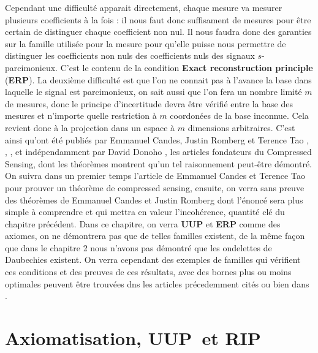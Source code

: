 Cependant une difficulté apparait directement, chaque mesure va mesurer plusieurs coefficients à la fois : il  nous faut donc suffisament de mesures pour être certain de distinguer chaque coefficient non nul.
Il nous faudra donc des garanties sur la famille utilisée pour la mesure pour qu'elle puisse nous permettre de distinguer les coefficients non nuls des coefficients nuls des signaux $s$-parcimonieux.
C'est le contenu de la condition \textbf{Exact reconstruction principle} (\textbf{ERP}).
\newline
La deuxième difficulté est que l'on ne connait pas à l'avance la base dans laquelle le signal est parcimonieux, on sait aussi que l'on fera un nombre limité $m$ de mesures, donc le principe d'incertitude devra être vérifié entre la base des mesures et n'importe quelle restriction à $m$ coordonées de la base inconnue.
Cela revient donc à la projection dans un espace à $m$ dimensions arbitraires.
C'est ainsi qu'ont été publiés par Emmanuel Candes, Justin Romberg et Terence Tao \cite{CR}, \cite{CT}, \cite{CRT}, et indépendamment par David Donoho \cite{DonohoCS}, les articles fondateurs du Compressed Sensing, dont les théorèmes montrent qu'un tel raisonnement peut-être démontré. 
\newline
On suivra dans un premier temps l'article de Emmanuel Candes et Terence Tao pour prouver un théorème de compressed sensing, ensuite, on verra sans preuve des théorèmes de Emmanuel Candes et Justin Romberg dont l'énoncé sera plus simple à comprendre et qui mettra en valeur l'incohérence, quantité clé du chapitre précédent.
Dans ce chapitre, on verra \textbf{UUP} et \textbf{ERP} comme des axiomes, on ne démontrera pas que de telles familles existent, de la même façon que dans le chapitre 2 nous n'avons pas démontré que les ondelettes de Daubechies existent.
On verra cependant des exemples de familles qui vérifient ces conditions et des preuves de ces résultats, avec des bornes plus ou moins optimales peuvent être trouvées dns les articles précedemment cités ou bien dans \cite{foucartbook}. 
\section{Axiomatisation, \textbf{UUP} et \textbf{RIP}}
